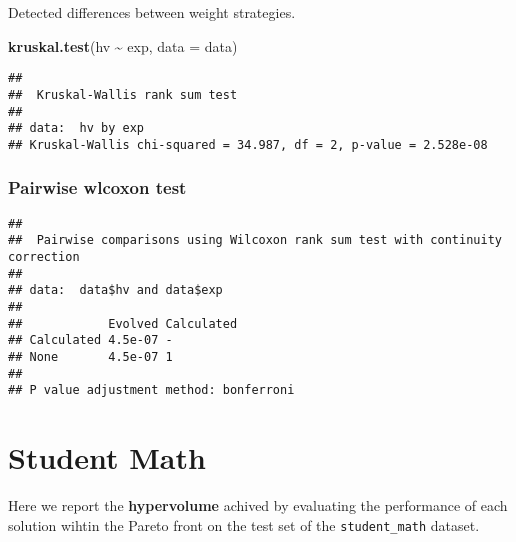 \documentclass[
]{book}
\newenvironment{Shaded}{\begin{snugshade}}{\end{snugshade}}
\newcommand{\AttributeTok}[1]{\textcolor[rgb]{0.13,0.29,0.53}{#1}}
\newcommand{\ConstantTok}[1]{\textcolor[rgb]{0.56,0.35,0.01}{#1}}
\newcommand{\FunctionTok}[1]{\textcolor[rgb]{0.13,0.29,0.53}{\textbf{#1}}}
\newcommand{\NormalTok}[1]{#1}
\newcommand{\SpecialCharTok}[1]{\textcolor[rgb]{0.81,0.36,0.00}{\textbf{#1}}}
\newcommand{\StringTok}[1]{\textcolor[rgb]{0.31,0.60,0.02}{#1}}
\begin{document}
Detected differences between weight strategies.

\begin{Shaded}
\begin{Highlighting}[]
\FunctionTok{kruskal.test}\NormalTok{(hv }\SpecialCharTok{\textasciitilde{}}\NormalTok{ exp, }\AttributeTok{data =}\NormalTok{ data)}
\end{Highlighting}
\end{Shaded}

\begin{verbatim}
## 
##  Kruskal-Wallis rank sum test
## 
## data:  hv by exp
## Kruskal-Wallis chi-squared = 34.987, df = 2, p-value = 2.528e-08
\end{verbatim}

\hypertarget{pairwise-wlcoxon-test}{%
\subsection{Pairwise wlcoxon test}\label{pairwise-wlcoxon-test}}

\begin{Shaded}
\end{Shaded}

\begin{verbatim}
## 
##  Pairwise comparisons using Wilcoxon rank sum test with continuity correction 
## 
## data:  data$hv and data$exp 
## 
##            Evolved Calculated
## Calculated 4.5e-07 -         
## None       4.5e-07 1         
## 
## P value adjustment method: bonferroni
\end{verbatim}

\hypertarget{student-math}{%
\chapter{Student Math}\label{student-math}}

Here we report the \textbf{hypervolume} achived by evaluating the performance of each solution wihtin the Pareto front on the test set of the \texttt{student\_math} dataset.
\end{document}
